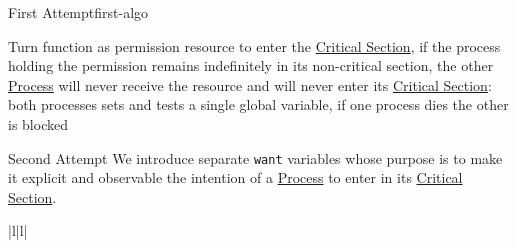 \begin{remark}{First Attempt}{first-algo}
\begin{note}
\begin{itemize}
                \begin{note}
                    Turn function as permission resource to enter the \hyperref[def:crit-sec]{Critical Section}, if the process holding the permission remains indefinitely in its non-critical section, the other \hyperref[def:process]{Process} will never receive the resource and will never enter its \hyperref[def:crit-sec]{Critical Section}: both processes sets and tests a single global variable, if one process dies the other is blocked
                \end{note}
        \end{itemize}
    \end{note}
\end{remark}
\begin{remark}{Second Attempt}{}
    We introduce separate \texttt{want} variables whose purpose is to make it explicit and observable the intention of a \hyperref[def:process]{Process} to enter in its \hyperref[def:crit-sec]{Critical Section}.
    \begin{ctable}{|l|l|}
        \hline
         \\
        \hline
         \\
         \\
        \hline
         \\
\end{ctable}
\end{remark}
